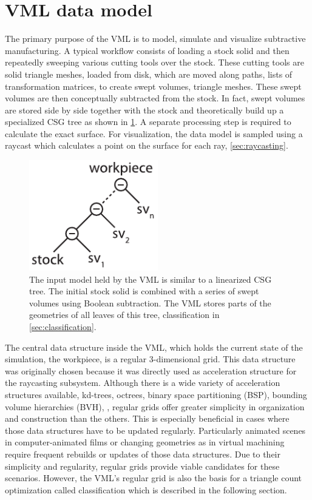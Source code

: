 \section{VML data model}
\label{sec:vml_data_model}

The primary purpose of the VML is to model, simulate and visualize subtractive manufacturing.
A typical workflow consists of loading a stock solid and then repeatedly sweeping various cutting tools over the stock.
These cutting tools are solid triangle meshes, loaded from disk, which are moved along paths, \ie lists of transformation matrices, to create swept volumes, \ie triangle meshes.
These swept volumes are then conceptually subtracted from the stock.
In fact, swept volumes are stored side by side together with the stock and theoretically build up a specialized CSG tree as shown in \cref{fig:vml_csg}.
A separate processing step is required to calculate the exact surface.
For visualization, the data model is sampled using a raycast which calculates a point on the surface for each ray, \cf \cref{sec:raycasting}.

\begin{figure}[h]
	\centering
	\includegraphics[width=0.5\textwidth]{images/vml_csg}
	\caption{
		The input model held by the VML is similar to a linearized CSG tree.
		The initial stock solid is combined with a series of swept volumes using Boolean subtraction.
		The VML stores parts of the geometries of all leaves of this tree, \cf classification in \cref{sec:classification}.
	}
	\label{fig:vml_csg}
\end{figure}


The central data structure inside the VML, which holds the current state of the simulation, \ie the workpiece, is a regular 3-dimensional grid.
This data structure was originally chosen because it was directly used as acceleration structure for the raycasting subsystem.
Although there is a wide variety of acceleration structures available, \eg kd-trees, octrees, binary space partitioning (BSP), bounding volume hierarchies (BVH), \etc, regular grids offer greater simplicity in organization and construction than the others.
This is especially beneficial in cases where those data structures have to be updated regularly.
Particularly animated scenes in computer-animated films or changing geometries as in virtual machining require frequent rebuilds or updates of those data structures.
Due to their simplicity and regularity, regular grids provide viable candidates for these scenarios.
However, the VML's regular grid is also the basis for a triangle count optimization called classification which is described in the following section.


